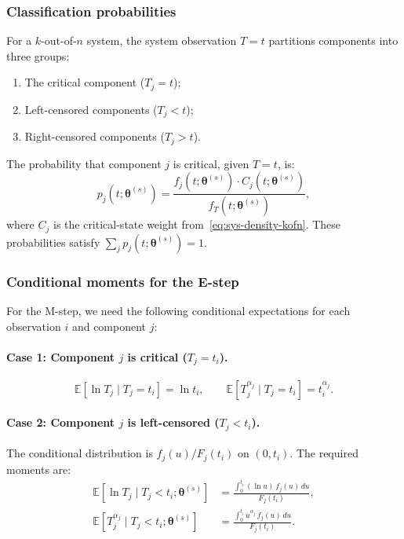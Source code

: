\documentclass[12pt]{article}
\theoremstyle{definition}
\theoremstyle{remark}
\newcommand{\E}{\mathbb{E}}
\newcommand{\btheta}{\bm{\theta}}
\begin{document}
\subsubsection{Classification probabilities}

For a $k$-out-of-$n$ system, the system observation $T = t$
partitions components into three groups:
\begin{enumerate}
\item The critical component ($T_j = t$);
\item Left-censored components ($T_j < t$);
\item Right-censored components ($T_j > t$).
\end{enumerate}
The probability that component $j$ is critical, given $T = t$, is:
\begin{equation}\label{eq:em-pij}
  p_j(t; \btheta^{(s)})
  = \frac{f_j(t; \btheta^{(s)}) \cdot C_j(t; \btheta^{(s)})}
         {f_T(t; \btheta^{(s)})},
\end{equation}
where $C_j$ is the critical-state weight
from~\eqref{eq:sys-density-kofn}.  These probabilities satisfy
$\sum_j p_j(t; \btheta^{(s)}) = 1$.

\subsubsection{Conditional moments for the E-step}

For the M-step, we need the following conditional expectations for
each observation $i$ and component $j$:

\paragraph{Case 1: Component $j$ is critical ($T_j = t_i$).}
\begin{equation}\label{eq:em-exact-case}
  \E[\ln T_j \mid T_j = t_i] = \ln t_i, \qquad
  \E[T_j^{\alpha_j} \mid T_j = t_i] = t_i^{\alpha_j}.
\end{equation}

\paragraph{Case 2: Component $j$ is left-censored ($T_j < t_i$).}
The conditional distribution is
$f_j(u) / F_j(t_i)$ on $(0, t_i)$.  The required moments are:
\begin{align}
  \E[\ln T_j \mid T_j < t_i; \btheta^{(s)}]
  &= \frac{\int_0^{t_i} (\ln u)\, f_j(u)\, du}{F_j(t_i)},
  \label{eq:em-left-lnT} \\
  \E[T_j^{\alpha_j} \mid T_j < t_i; \btheta^{(s)}]
  &= \frac{\int_0^{t_i} u^{\alpha_j}\, f_j(u)\, du}{F_j(t_i)}.
  \label{eq:em-left-Talpha}
\end{align}
\end{document}
